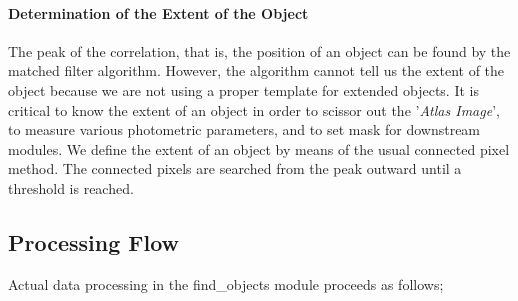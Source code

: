 \paragraph{Determination of the Extent of the Object}

The peak of the correlation, that is, the position of an object can be
found by the matched filter algorithm. However, the algorithm cannot
tell us the extent of the object because we are not using a proper
template for extended objects.  It is critical to know the extent
of an object in order to scissor out the '{\it Atlas Image}', to
measure various photometric parameters, and to set mask for downstream
modules. We define the extent of an object by means of the usual
connected pixel method.  The connected pixels are searched from the
peak outward until a threshold is reached.

\subsection{Processing Flow}

Actual data processing in the find\_objects module proceeds as follows;

